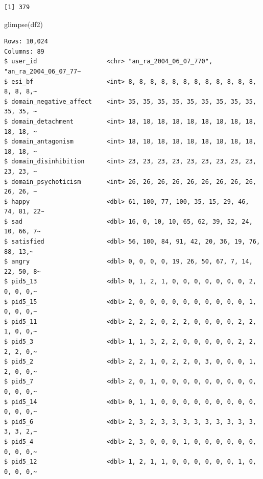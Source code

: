 \documentclass[
  11pt,
  a4paper,
  onecolumn]{article}
\newenvironment{Shaded}{}{}
\newcommand{\FunctionTok}[1]{\textcolor[rgb]{0.44,0.26,0.76}{#1}}
\newcommand{\NormalTok}[1]{\textcolor[rgb]{0.14,0.16,0.18}{#1}}
\newcommand{\SpecialCharTok}[1]{\textcolor[rgb]{0.00,0.36,0.77}{#1}}
\begin{document}
\begin{Shaded}
\end{Shaded}

\begin{verbatim}
[1] 379
\end{verbatim}

\begin{Shaded}
\begin{Highlighting}[]
\FunctionTok{glimpse}\NormalTok{(df2)}
\end{Highlighting}
\end{Shaded}

\begin{verbatim}
Rows: 10,024
Columns: 89
$ user_id                   <chr> "an_ra_2004_06_07_770", "an_ra_2004_06_07_77~
$ esi_bf                    <int> 8, 8, 8, 8, 8, 8, 8, 8, 8, 8, 8, 8, 8, 8, 8,~
$ domain_negative_affect    <int> 35, 35, 35, 35, 35, 35, 35, 35, 35, 35, 35, ~
$ domain_detachment         <int> 18, 18, 18, 18, 18, 18, 18, 18, 18, 18, 18, ~
$ domain_antagonism         <int> 18, 18, 18, 18, 18, 18, 18, 18, 18, 18, 18, ~
$ domain_disinhibition      <int> 23, 23, 23, 23, 23, 23, 23, 23, 23, 23, 23, ~
$ domain_psychoticism       <int> 26, 26, 26, 26, 26, 26, 26, 26, 26, 26, 26, ~
$ happy                     <dbl> 61, 100, 77, 100, 35, 15, 29, 46, 74, 81, 22~
$ sad                       <dbl> 16, 0, 10, 10, 65, 62, 39, 52, 24, 10, 66, 7~
$ satisfied                 <dbl> 56, 100, 84, 91, 42, 20, 36, 19, 76, 88, 13,~
$ angry                     <dbl> 0, 0, 0, 0, 19, 26, 50, 67, 7, 14, 22, 50, 8~
$ pid5_13                   <dbl> 0, 1, 2, 1, 0, 0, 0, 0, 0, 0, 0, 2, 0, 0, 0,~
$ pid5_15                   <dbl> 2, 0, 0, 0, 0, 0, 0, 0, 0, 0, 0, 1, 0, 0, 0,~
$ pid5_11                   <dbl> 2, 2, 2, 0, 2, 2, 0, 0, 0, 0, 2, 2, 1, 0, 0,~
$ pid5_3                    <dbl> 1, 1, 3, 2, 2, 0, 0, 0, 0, 0, 2, 2, 2, 2, 0,~
$ pid5_2                    <dbl> 2, 2, 1, 0, 2, 2, 0, 3, 0, 0, 0, 1, 2, 0, 0,~
$ pid5_7                    <dbl> 2, 0, 1, 0, 0, 0, 0, 0, 0, 0, 0, 0, 0, 0, 0,~
$ pid5_14                   <dbl> 0, 1, 1, 0, 0, 0, 0, 0, 0, 0, 0, 0, 0, 0, 0,~
$ pid5_6                    <dbl> 2, 3, 2, 3, 3, 3, 3, 3, 3, 3, 3, 3, 3, 3, 2,~
$ pid5_4                    <dbl> 2, 3, 0, 0, 0, 1, 0, 0, 0, 0, 0, 0, 0, 0, 0,~
$ pid5_12                   <dbl> 1, 2, 1, 1, 0, 0, 0, 0, 0, 0, 1, 0, 0, 0, 0,~

\end{verbatim}
\end{document}
